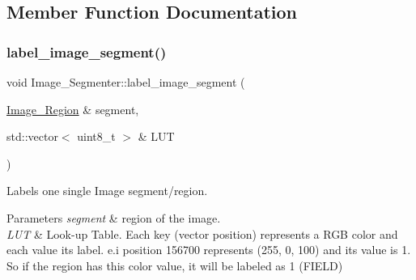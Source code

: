 \subsection{Member Function Documentation}
\mbox{\label{class_image___segmenter_aee5692fbdcf547fa9ac5e2fa3470adef}} 
\subsubsection{\texorpdfstring{label\+\_\+image\+\_\+segment()}{label\_image\_segment()}}
{\footnotesize\ttfamily void Image\+\_\+\+Segmenter\+::label\+\_\+image\+\_\+segment (\begin{DoxyParamCaption}\item[{\hyperlink{class_image___region}{Image\+\_\+\+Region} \&}]{segment,  }\item[{std\+::vector$<$ uint8\+\_\+t $>$ \&}]{L\+UT }\end{DoxyParamCaption})}



Labels one single Image segment/region. 


\begin{DoxyParams}{Parameters}
{\em segment} & region of the image. \\
\hline
{\em L\+UT} & Look-\/up Table. Each key (vector position) represents a R\+GB color and each value its label. e.\+i position 156700 represents (255, 0, 100) and its value is 1. So if the region has this color value, it will be labeled as 1 (F\+I\+E\+LD) \\
\hline
\end{DoxyParams}
\mbox{\label{class_image___segmenter_a870ea17617700926ae337d2f93465393}} 
